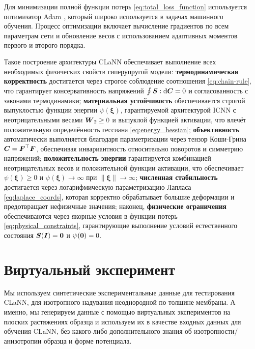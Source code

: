 Для минимизации полной функции потерь \eqref{eq:total_loss_function} используется оптимизатор Adam \cite{kingma2014adam}, 
который широко используется в задачах машинного обучения. 
Процесс оптимизации включает вычисление градиентов по всем параметрам сети и обновление весов 
с использованием адаптивных моментов первого и второго порядка.

Такое построение архитектуры CLaNN обеспечивает выполнение всех необходимых физических свойств гиперупругой модели: 
\textbf{термодинамическая корректность} достигается через строгое соблюдение соотношения \eqref{eq:chain-rule}, 
что гарантирует консервативность напряжений $\oint \boldsymbol{S}:\mathrm{d}\boldsymbol{C} = 0$ и согласованность с законами 
термодинамики; \textbf{материальная устойчивость} обеспечивается строгой выпуклостью функции энергии 
$\psi(\boldsymbol{\xi})$, гарантируемой архитектурой ICNN с неотрицательными весами $\boldsymbol{W}_2 \geq 0$ и 
выпуклой функцией активации, что влечёт положительную определённость гессиана \eqref{eq:energy_hessian}; \textbf{объективность} автоматически выполняется благодаря параметризации через тензор 
Коши-Грина $\boldsymbol{C} = \boldsymbol{F}^{\top}\boldsymbol{F}$, обеспечивая инвариантность относительно поворотов и симметрию напряжений; 
\textbf{положительность энергии} гарантируется комбинацией неотрицательных весов и положительной функции активации, 
что обеспечивает $\psi(\boldsymbol{\xi}) \geq 0$ и $\psi(\boldsymbol{\xi}) \to \infty$ при $\|\boldsymbol{\xi}\| 
\to \infty$; \textbf{численная стабильность} достигается через логарифмическую параметризацию Лапласа \eqref{eq:laplace_coords}, которая корректно обрабатывает большие деформации и предотвращает нефизичные значения; наконец, \textbf{физические ограничения} обеспечиваются через якорные условия в функции потерь \eqref{eq:physical_constraints}, гарантирующие выполнение условий естественного состояния $\boldsymbol{S}(\boldsymbol{I}) = \boldsymbol{0}$ и $\psi(\boldsymbol{0}) = 0$.



\section{Виртуальный эксперимент}

Мы используем синтетические экспериментальные данные для тестирования CLaNN, для изотропного надувания неоднородной по толщине мембраны. 
А именно, мы генерируем данные с помощью виртуальных экспериментов на плоских растяжениях образца и используем их в качестве входных данных для 
обучения CLaNN, без какого-либо дополнительного знания об изотропности/анизотропии образца и форме потенциала.
 
